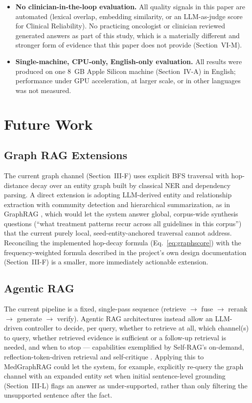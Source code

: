\documentclass[conference]{IEEEtran}
\begin{document}
\begin{itemize}
    \item \textbf{No clinician-in-the-loop evaluation.} All quality signals in this paper are automated (lexical overlap, embedding similarity, or an LLM-as-judge score for Clinical Reliability). No practicing oncologist or clinician reviewed generated answers as part of this study, which is a materially different and stronger form of evidence that this paper does not provide (Section~VI-M).
    \item \textbf{Single-machine, CPU-only, English-only evaluation.} All results were produced on one 8~GB Apple Silicon machine (Section~IV-A) in English; performance under GPU acceleration, at larger scale, or in other languages was not measured.
\end{itemize}

\section{Future Work}

\subsection{Graph RAG Extensions}
The current graph channel (Section~III-F) uses explicit BFS traversal with hop-distance decay over an entity graph built by classical NER and dependency parsing. A direct extension is adopting LLM-derived entity and relationship extraction with community detection and hierarchical summarization, as in GraphRAG \cite{edge2024graphrag}, which would let the system answer global, corpus-wide synthesis questions (``what treatment patterns recur across all guidelines in this corpus'') that the current purely local, seed-entity-anchored traversal cannot address. Reconciling the implemented hop-decay formula (Eq.~\ref{eq:graphscore}) with the frequency-weighted formula described in the project's own design documentation (Section~III-F) is a smaller, more immediately actionable extension.

\subsection{Agentic RAG}
The current pipeline is a fixed, single-pass sequence (retrieve $\rightarrow$ fuse $\rightarrow$ rerank $\rightarrow$ generate $\rightarrow$ verify). Agentic RAG architectures \cite{singhagenticrag2025} instead allow an LLM-driven controller to decide, per query, whether to retrieve at all, which channel(s) to query, whether retrieved evidence is sufficient or a follow-up retrieval is needed, and when to stop --- capabilities exemplified by Self-RAG's on-demand, reflection-token-driven retrieval and self-critique \cite{asai2024selfrag}. Applying this to MedGraphRAG could let the system, for example, explicitly re-query the graph channel with an expanded entity set when initial sentence-level grounding (Section~III-L) flags an answer as under-supported, rather than only filtering the unsupported sentence after the fact.
\end{document}
